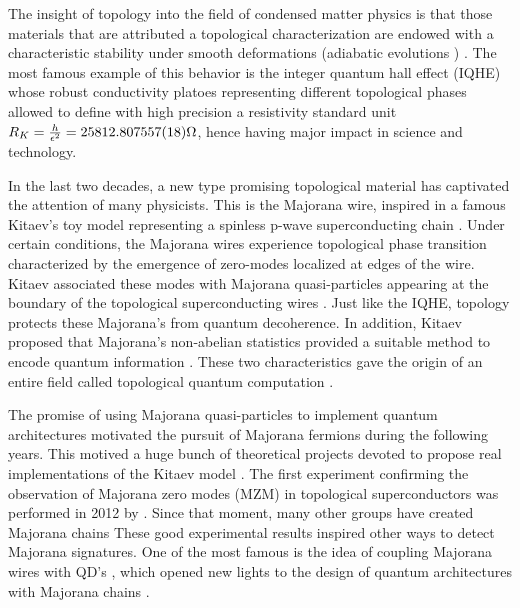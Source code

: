 The insight of topology into  the field of condensed matter physics is that those materials that are attributed a topological characterization are endowed with a characteristic stability under smooth deformations (adiabatic evolutions ) . The most famous example of this behavior is the integer quantum hall effect (IQHE) whose robust conductivity platoes representing different topological phases allowed to define with high precision a resistivity standard unit $ R_K =\frac{h}{\epsilon^2} = 25812.807557(18) \Omega$, hence having major impact in science and technology. 



In the last two decades, a new type promising topological material has captivated the attention of many physicists. This is the Majorana wire, inspired in a famous Kitaev's toy model representing a spinless p-wave superconducting chain \cite{kitaev_unpaired_2001}. Under certain conditions, the Majorana wires experience topological phase transition characterized by the emergence of  zero-modes localized at edges of the wire. Kitaev associated these modes with Majorana quasi-particles  appearing at the boundary of the topological superconducting wires . Just like the IQHE, topology protects these  Majorana's  from quantum decoherence. In addition, Kitaev proposed that  Majorana's non-abelian statistics provided a suitable method to encode quantum information \cite{kitaev_fault-tolerant_2003}. These two characteristics gave the   origin of an entire field called topological quantum computation \cite{pachos_introduction_2012}.

The promise of using Majorana quasi-particles to implement quantum architectures motivated the pursuit of Majorana fermions during the following years. This motived a huge bunch of theoretical projects devoted to propose real implementations of the Kitaev model \cite{alicea_majorana_2010,alicea_new_2012,beenakker_search_2013,sarma_majorana_2015,plugge_majorana_2017,aasen_milestones_2016}. The first experiment confirming the observation of  Majorana zero modes (MZM) in topological superconductors was performed in 2012 by \citeauthor{mourik_signatures_2012}. Since that moment, many other groups have created Majorana chains \cite{das_zero-bias_2012,deng_anomalous_2012,nadj-perge_observation_2014,deng_majorana_2016,zhang_quantized_2018} These good experimental results inspired other ways to detect Majorana signatures. One of the most famous is the idea of coupling Majorana wires with QD's \cite{liu_detecting_2011}, which opened new lights to the design of quantum architectures with Majorana chains \cite{barkeshli_physical_2015,karzig_scalable_2017}. 

